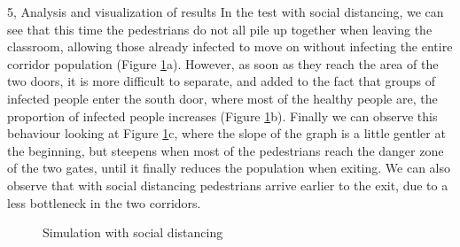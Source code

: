 \begin{task}{5, Analysis and visualization of results}
In the test with social distancing, we can see that this time the pedestrians do not all pile up together when leaving the classroom, allowing those already infected to move on without infecting the entire corridor population (Figure \ref{tumdist}a). However, as soon as they reach the area of the two doors, it is more difficult to separate, and added to the fact that groups of infected people enter the south door, where most of the healthy people are, the proportion of infected people increases (Figure \ref{tumdist}b). Finally we can observe this behaviour looking at Figure \ref{tumdist}c, where the slope of the graph is a little gentler at the beginning, but steepens when most of the pedestrians reach the danger zone of the two gates, until it finally reduces the population when exiting. We can also observe that with social distancing pedestrians arrive earlier to the exit, due to a less bottleneck in the two corridors.
\begin{figure}[H]
\centering
{}
\caption{Simulation with social distancing}
\label{tumdist}
\end{figure}


\end{task}
